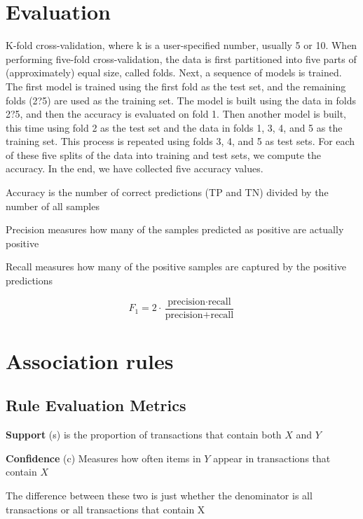 \documentclass[12pt]{amsart}
\begin{document}
\section{Evaluation}

K-fold cross-validation, where k is a user-specified number, usually 5 or 10. When performing five-fold cross-validation, the data is first partitioned into five parts of (approximately) equal size, called folds. Next, a sequence of models is trained. The first model is trained using the first fold as the test set, and the remaining folds (2?5) are used as the training set. The model is built using the data in folds 2?5, and then the accuracy is evaluated on fold 1. Then another model is built, this time using fold 2 as the test set and the data in folds 1, 3, 4, and 5 as the training set. This process is repeated using folds 3, 4, and 5 as test sets. For each of these five splits of the data into training and test sets, we compute the accuracy. In the end, we have collected five accuracy values.

Accuracy is the number of correct predictions (TP and TN) divided by the number of all samples

Precision measures how many of the samples predicted as positive are actually positive

Recall measures how many of the positive samples are captured by the positive predictions

\begin{equation*}
F_1 = 2 \cdot \frac{\text{precision} \cdot \text{recall}}{\text{precision} + \text{recall}}
\end{equation*}




\section{Association rules}


\subsection{Rule Evaluation Metrics}
\textbf{Support} (s) is the proportion of transactions that contain both $X$ and $Y$

\textbf{Confidence} (c) Measures how often items in $Y$ appear in transactions that contain $X$

The difference between these two is just whether the denominator is all transactions or all transactions that contain X
\end{document}
